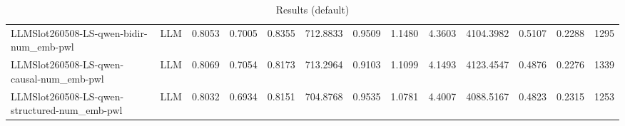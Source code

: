 \begin{table}[htbp]
{\begin{tabular}{ll|rrrrrrrrrr|r}
LLMSlot260508-LS-qwen-bidir-num\_emb-pwl & LLM & 0.8053 & 0.7005 & 0.8355 & 712.8833 & 0.9509 & 1.1480 & 4.3603 & 4104.3982 & 0.5107 & 0.2288 & 1295 \\
LLMSlot260508-LS-qwen-causal-num\_emb-pwl & LLM & 0.8069 & 0.7054 & 0.8173 & 713.2964 & 0.9103 & 1.1099 & 4.1493 & 4123.4547 & 0.4876 & 0.2276 & 1339 \\
LLMSlot260508-LS-qwen-structured-num\_emb-pwl & LLM & 0.8032 & 0.6934 & 0.8151 & 704.8768 & 0.9535 & 1.0781 & 4.4007 & 4088.5167 & 0.4823 & 0.2315 & 1253 \\
\bottomrule
\end{tabular}
}
\caption{Results (default)}
\label{tab:results_default}
\end{table}